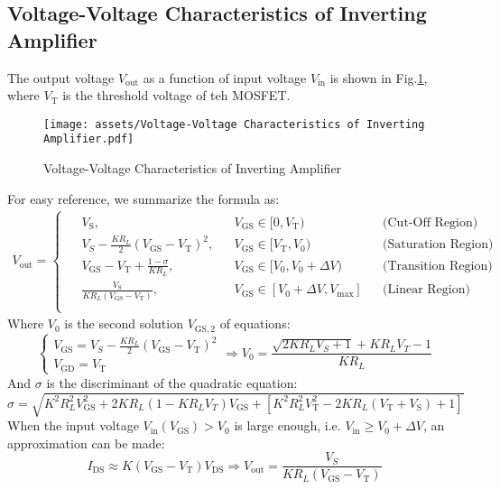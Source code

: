 \documentclass[UTF8]{article}
\theoremstyle{MyLineTheoremStyle} %
\theoremstyle{MyBlockTheoremStyle} %
\theoremstyle{MySubsubsectionStyle} %
\begin{document}
\subsection{Voltage-Voltage Characteristics of Inverting Amplifier}
The output voltage $V_{\text{out}}$ as a function of input voltage $V_\text{in}$ is shown in Fig.\ref{Voltage-Voltage Characteristics}, where $V_\text{T}$ is the threshold voltage of teh MOSFET.
\begin{figure}[H]\centering
    \texttt{[image: assets/Voltage-Voltage Characteristics of Inverting Amplifier.pdf]}
    \caption{Voltage-Voltage Characteristics of Inverting Amplifier}
    \label{Voltage-Voltage Characteristics}
\end{figure}
For easy reference, we summarize the formula as:
\begin{gather}
V_{\text{out}} = 
\begin{cases}
\begin{aligned}
    &V_\text{S}, && V_\text{GS} \in [0, V_\text{T}) && \text{(Cut-Off Region)} \\ 
    &V_S - \frac{KR_L}{2}\left(V_\text{GS} - V_\text{T}\right)^2, && V_\text{GS} \in [V_\text{T}, V_0) &&\text{(Saturation Region)} \\ 
    &V_\text{GS} - V_\text{T} + \frac{1 - \sigma}{KR_L}, && V_\text{GS} \in [V_0, V_0 + \Delta V) &&\text{(Transition Region)} \\ 
    &\frac{V_\text{S}}{KR_L (V_\text{GS} - V_\text{T})},\quad && V_\text{GS} \in [V_0 + \Delta V, V_{\max}] &&\text{(Linear Region)} \\
\end{aligned}
\end{cases}
\end{gather}
Where $V_0$ is the second solution $V_{\text{GS}, 2}$ of equations:
\begin{equation}
\begin{cases}
    V_\text{GS} = V_S - \frac{KR_L}{2}\left(V_\text{GS} - V_\text{T}\right)^2 \\ 
    V_\text{GD} = V_\text{T}
\end{cases}\Longrightarrow 
V_0 = \frac{\sqrt{ 2KR_LV_S + 1 } + KR_L V_T - 1}{K R_L}
\end{equation}
And $\sigma$ is the discriminant of the quadratic equation:
\begin{equation}
\sigma = \sqrt{
K^2R_L^2 V_\text{GS}^2 + 2KR_L\left(1 - KR_L V_T\right) V_\text{GS} + \left[ K^2R_L^2 V_\text{T}^2 - 2KR_L( V_\text{T} + V_\text{S}) + 1\right] 
}
\end{equation}
When the input voltage $V_\text{in} (V_{\text{GS}}) > V_0$ is large enough, i.e. $V_\text{in} \geqslant V_0 + \Delta V$, an approximation can be made:
\begin{equation}
I_\text{DS} \approx K \left(V_\text{GS} - V_\text{T} \right) V_\text{DS} \Longrightarrow V_{\text{out}} = \frac{V_S}{KR_L (V_\text{GS} - V_\text{T})}
\end{equation}
\end{document}

